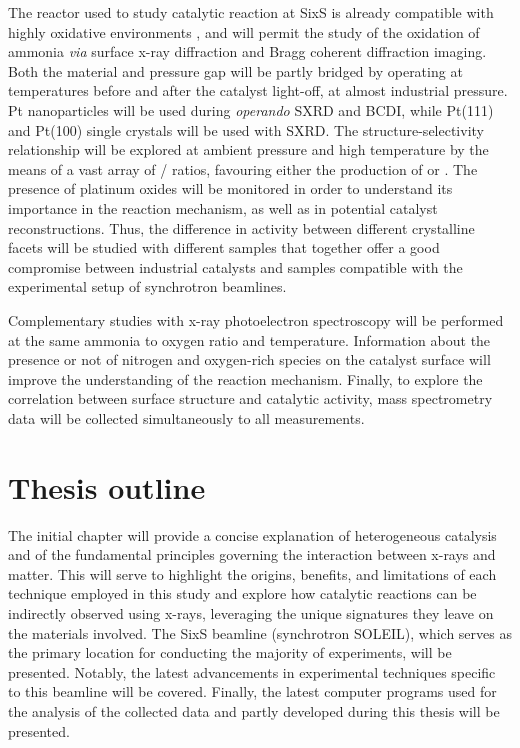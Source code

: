 The reactor used to study catalytic reaction at SixS is already compatible with highly oxidative environments \parencite{VanRijn2010, Resta2020a}, and will permit the study of the oxidation of ammonia \textit{via} surface x-ray diffraction and Bragg coherent diffraction imaging.
Both the material and pressure gap will be partly bridged by operating at temperatures before and after the catalyst light-off, at almost industrial pressure.
Pt nanoparticles will be used during \textit{operando} SXRD and BCDI, while Pt(111) and Pt(100) single crystals will be used with SXRD.
The structure-selectivity relationship will be explored at ambient pressure and high temperature by the means of a vast array of / ratios, favouring either the production of  or .
The presence of platinum oxides will be monitored in order to understand its importance in the reaction mechanism, as well as in potential catalyst reconstructions.
Thus, the difference in activity between different crystalline facets will be studied with different samples that together offer a good compromise between industrial catalysts and samples compatible with the experimental setup of synchrotron beamlines.

Complementary studies with x-ray photoelectron spectroscopy will be performed at the same ammonia to oxygen ratio and temperature.
Information about the presence or not of nitrogen and oxygen-rich species on the catalyst surface will improve the understanding of the reaction mechanism.
Finally, to explore the correlation between surface structure and catalytic activity, mass spectrometry data will be collected simultaneously to all measurements.

\section{Thesis outline}

The initial chapter will provide a concise explanation of heterogeneous catalysis and of the fundamental principles governing the interaction between x-rays and matter.
This will serve to highlight the origins, benefits, and limitations of each technique employed in this study and explore how catalytic reactions can be indirectly observed using x-rays, leveraging the unique signatures they leave on the materials involved.
The SixS beamline (synchrotron SOLEIL), which serves as the primary location for conducting the majority of experiments, will be presented.
Notably, the latest advancements in experimental techniques specific to this beamline will be covered.
Finally, the latest computer programs used for the analysis of the collected data and partly developed during this thesis will be presented.


